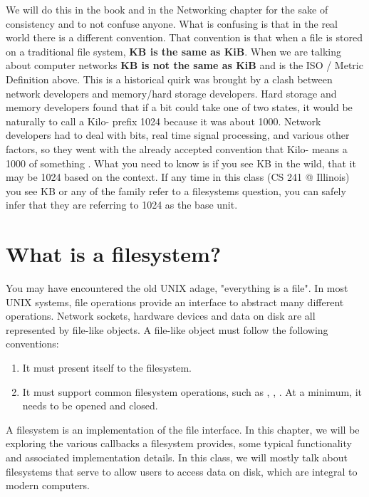 We will do this in the book and in the Networking chapter for the sake of consistency and to not confuse anyone.
What is confusing is that in the real world there is a different convention.
That convention is that when a file is stored on a traditional file system, \textbf{KB is the same as KiB}.
When we are talking about computer networks \textbf{KB is not the same as KiB} and is the ISO / Metric Definition above.
This is a historical quirk was brought by a clash between network developers and memory/hard storage developers.
Hard storage and memory developers found that if a bit could take one of two states, it would be naturally to call a Kilo- prefix 1024 because it was about 1000.
Network developers had to deal with bits, real time signal processing, and various other factors, so they went with the already accepted convention that Kilo- means a 1000 of something .
What you need to know is if you see KB in the wild, that it may be 1024 based on the context.
If any time in this class (CS 241 @ Illinois) you see KB or any of the family refer to a filesystems question, you can safely infer that they are referring to 1024 as the base unit.

\section{What is a filesystem?}

You may have encountered the old UNIX adage, "everything is a file".
In most UNIX systems, file operations provide an interface to abstract many different operations.
Network sockets, hardware devices and data on disk are all represented by file-like objects.
A file-like object must follow the following conventions:

\begin{enumerate}
  \item It must present itself to the filesystem.
  \item It must support common filesystem operations, such as , , .
        At a minimum, it needs to be opened and closed.
\end{enumerate}

A filesystem is an implementation of the file interface.
In this chapter, we will be exploring the various callbacks a filesystem provides, some typical functionality and associated implementation details.
In this class, we will mostly talk about filesystems that serve to allow users to access data on disk, which are integral to modern computers.

